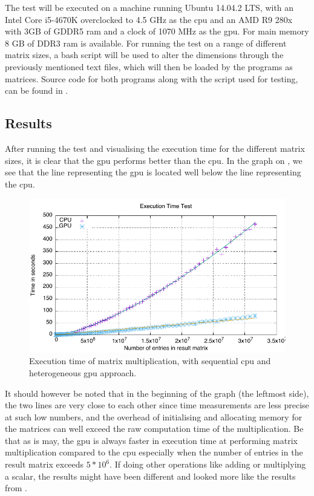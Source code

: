The test will be executed on a machine running Ubuntu 14.04.2 LTS, with an Intel Core i5-4670K overclocked to 4.5 GHz as the \acrshort{cpu} and an AMD R9 280x with 3GB of GDDR5 ram and a clock of 1070 MHz as the \acrshort{gpu}.
For main memory 8 GB of DDR3 ram is available.
For running the test on a range of different matrix sizes, a bash script will be used to alter the dimensions through the previously mentioned text files, which will then be loaded by the programs as matrices.
Source code for both programs along with the script used for testing, can be found in .

\subsection{Results} %
\label{sub:results}
After running the test and visualising the execution time for the different matrix sizes, it is clear that the \acrshort{gpu} performs better than the \acrshort{cpu}.
In the graph on , we see that the line representing the \acrshort{gpu} is located well below the line representing the \acrshort{cpu}.   
\begin{figure}[h]
    \centering
    \includegraphics{figures/tests/graph.pdf}
    \caption{Execution time of matrix multiplication, with sequential \acrshort{cpu} and heterogeneous \acrshort{gpu} approach. }\label{fig:test_results}
\end{figure} 
It should however be noted that in the beginning of the graph (the leftmost side), the two lines are very close to each other since time measurements are less precise at such low numbers, and the overhead of initialising and allocating memory for the matrices can well exceed the raw computation time of the multiplication. 
Be that as is may, the \acrshort{gpu} is always faster in execution time at performing matrix multiplication compared to the \acrshort{cpu} especially when the number of entries in the result matrix exceeds $5*10^6$.
If doing other operations like adding or multiplying a scalar, the results might have been different and looked more like the results from . 


